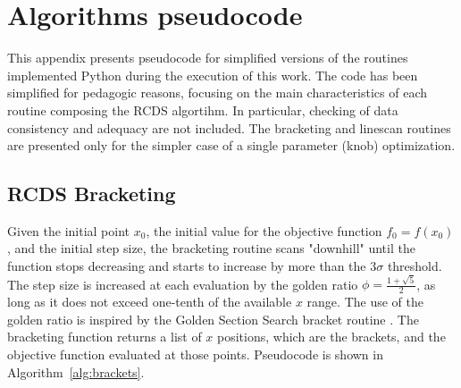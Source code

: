 \chapter{Algorithms pseudocode}
\label{chap:pseudocode}
This appendix presents pseudocode for simplified versions of the routines implemented Python during the execution of this work. The code has been simplified for pedagogic reasons, focusing on the main characteristics of each routine composing the RCDS algortihm. In particular, checking of data consistency and adequacy are not included. The bracketing and linescan routines are presented only for the simpler case of a single parameter (knob) optimization.
\section{RCDS Bracketing}
Given the initial point $x_0$, the initial value for the objective function $f_0 = f(x_0)$, and the initial step size, the bracketing routine scans "downhill" until the function stops decreasing and starts to increase by more than the $3\sigma$ threshold. The step size is increased at each evaluation by the golden ratio $\phi=\frac{1+\sqrt{5}}{2}$, as long as it does not exceed one-tenth of the available $x$ range. The use of the golden ratio is inspired by the Golden Section Search bracket routine \cite[sec. 10.2]{press_numerical_2007}. The bracketing function returns a list of $x$ positions, which are the brackets, and the objective function evaluated at those points. Pseudocode is shown in Algorithm~\ref{alg:brackets}.
